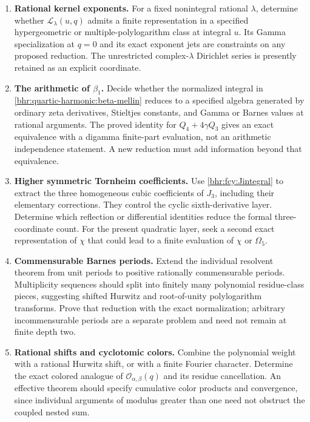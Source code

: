 \begin{enumerate}[label=\textbf{F\arabic*.},leftmargin=*,itemsep=9pt]
 \item \textbf{Rational kernel exponents.}
 For a fixed nonintegral rational $\lambda$, determine whether
 $\mathcal L_\lambda(u,q)$ admits a finite representation in a
 specified hypergeometric or multiple-polylogarithm class at
 integral $u$. Its Gamma specialization at $q=0$ and its exact
 exponent jets are constraints on any proposed reduction. The
 unrestricted complex-$\lambda$ Dirichlet series is presently
 retained as an explicit coordinate.

 \item \textbf{The arithmetic of $\beta_1$.}
 Decide whether the normalized integral in
 \eqref{bhr:quartic-harmonic:beta-mellin} reduces to a specified
 algebra generated by ordinary zeta derivatives, Stieltjes
 constants, and Gamma or Barnes values at rational arguments.
 The proved identity for $Q_4+4\gamma Q_3$ gives an exact
 equivalence with a digamma finite-part evaluation, not an
 arithmetic independence statement. A new reduction must add
 information beyond that equivalence.

 \item \textbf{Higher symmetric Tornheim coefficients.}
 Use \eqref{bhr:fcy:Jintegral} to extract the three homogeneous cubic
 coefficients of $J_3$, including their elementary corrections.
 They control the cyclic sixth-derivative layer. Determine which
 reflection or differential identities reduce the formal
 three-coordinate count. For the present quadratic layer, seek
 a second exact representation of $\chi$ that could lead to a
 finite evaluation of $\chi$ or $\Omega_5$.

 \item \textbf{Commensurable Barnes periods.}
 Extend the individual resolvent theorem from unit periods to
 positive rationally commensurable periods. Multiplicity
 sequences should split into finitely many polynomial
 residue-class pieces, suggesting shifted Hurwitz and root-of-unity
 polylogarithm transforms. Prove that reduction with the exact
 normalization; arbitrary incommensurable periods are a separate
 problem and need not remain at finite depth two.

 \item \textbf{Rational shifts and cyclotomic colors.}
 Combine the polynomial weight with a rational Hurwitz shift,
 or with a finite Fourier character. Determine the exact
 colored analogue of $\mathcal O_{\alpha,\beta}(q)$ and its
 residue cancellation. An effective theorem should specify
 cumulative color products and convergence, since individual
 arguments of modulus greater than one need not obstruct the
 coupled nested sum.


\end{enumerate}

